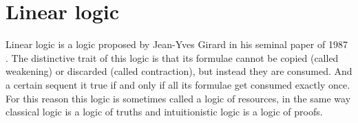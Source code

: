 % 
% 

\section{Linear logic}
Linear logic is a logic proposed by Jean-Yves Girard in his seminal paper of 1987 \cite{LinearLogic}.
The distinctive trait of this logic is that its formulae cannot be copied (called weakening) or discarded (called contraction), but instead they are consumed.
And a certain sequent it true if and only if all its formulae get consumed exactly once.
For this reason this logic is sometimes called a logic of resources, in the same way classical logic is a logic of truths and intuitionistic logic is a logic of proofs.

